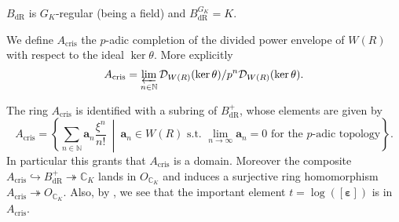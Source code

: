 \begin{prop}
	$B_{\mathrm{dR}}$ is $G_K$-regular
	(being a field) and $B_{\mathrm{dR}}^{G_K} = K$.
\end{prop}


\begin{defn}[]
	We define $A_{\mathrm{cris}}$ the $p$-adic completion of the
	divided power envelope of $W(R)$ with respect to the ideal $\ker \theta$.
	More explicitly
	\begin{equation*}
		A_{\mathrm{cris}} = \varprojlim_{n \in \mathbb{N}} 
		\mathcal{D}_{W(R)}(\ker\theta)/p^n\mathcal{D}_{W(R)}(\ker\theta)
	.\end{equation*}
\end{defn}


\begin{rem}
	The ring $A_{\mathrm{cris}}$ is identified with a subring
	of $B_{\mathrm{dR}}^+$, whose elements are given by
	\begin{equation*}
	A_{\mathrm{cris}} = 
	\left\{ \sum_{n \in \mathbb{N} }^{  } \mathbf{a}_n \frac{ \xi^n }{ n! } \ \middle|\ 
	\mathbf{a}_n \in W(R) \text{ s.t. } \lim_{n \to \infty} \mathbf{a}_n = 0
	\text{ for the $p$-adic topology}\right\}
	.\end{equation*}
	In particular this grants that $A_{\mathrm{cris}}$ is a domain.
	Moreover the composite $A_{\mathrm{cris}} \hookrightarrow B_{\mathrm{dR}}^+ 
	\twoheadrightarrow \mathbb{C}_K$ lands in $O_{\mathbb{C}_K}$
	and induces a surjective ring homomorphism $A_{\mathrm{cris}} \twoheadrightarrow O_{\mathbb{C}_K}$.
	Also, by {\cite[Proposition 9.1.3]{Brinon}}, we see that the important
	element $t = \log ([\boldsymbol\varepsilon])$ is in $A_{\mathrm{cris}}$.
\end{rem}


